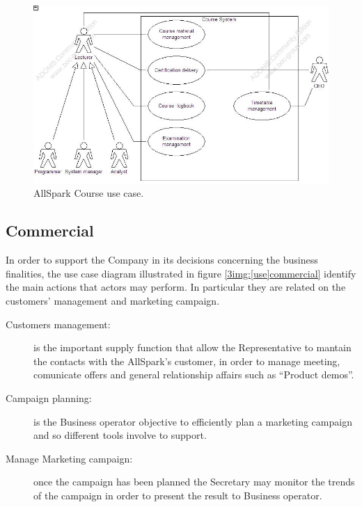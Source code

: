 \begin{figure}
\begin{centering}
\includegraphics[scale=0.45]{assign3/adonis/imgs/course.jpg}
\caption{AllSpark Course use case.}
\label{3img:[use]Course}
\end{centering}
\end{figure}


\subsection{Commercial}
In order to support the Company in its decisions concerning the business finalities, the use case diagram illustrated in figure \ref{3img:[use]commercial} identify the main actions that actors may perform. In particular they are related on the customers' management and marketing campaign.
\begin{description}
 \item[Customers management:] is the important supply function that allow the Representative to mantain the contacts with the AllSpark's customer, in order to manage meeting, comunicate offers and general relationship affairs such as ``Product demos''.
 \item[Campaign planning:] is the Business operator objective to efficiently plan a marketing campaign and so different tools involve to support.
 \item[Manage Marketing campaign:] once the campaign has been planned the Secretary may monitor the trends of the campaign in order to present the result to Business operator.
\end{description}

